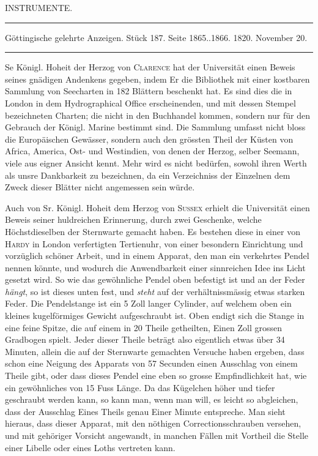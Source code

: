 \clearpage
{}
\begin{center}
{\large INSTRUMENTE.}
\end{center}

\begin{center}
\noindent\rule{\linewidth}{0.4pt}

Göttingische gelehrte Anzeigen. Stück 187. Seite 1865..1866. 1820. November 20.

\noindent\rule{\linewidth}{0.4pt}
\end{center}

Se Königl. Hoheit der Herzog von \textsc{Clarence} hat der Universität einen Beweis
seines gnädigen Andenkens gegeben, indem Er die Bibliothek mit einer kostbaren Sammlung
von Seecharten in 182 Blättern beschenkt hat. Es sind dies die in London in dem
Hydrographical Office erscheinenden, und mit dessen Stempel bezeichneten Charten; die
nicht in den Buchhandel kommen, sondern nur für den Gebrauch der Königl. Marine bestimmt
sind. Die Sammlung umfasst nicht bloss die Europäischen Gewässer, sondern auch den
grössten Theil der Küsten von Africa, America, Ost- und Westindien, von denen der
Herzog, selber Seemann, viele aus eigner Ansicht kennt. Mehr wird es nicht bedürfen,
sowohl ihren Werth als unsre Dankbarkeit zu bezeichnen, da ein Verzeichniss der
Einzelnen dem Zweck dieser Blätter nicht angemessen sein würde.

Auch von Sr. Königl. Hoheit dem Herzog von \textsc{Sussex} erhielt die Universität einen
Beweis seiner huldreichen Erinnerung, durch zwei Geschenke, welche Höchstdieselben der
Sternwarte gemacht haben. Es bestehen diese in einer von \textsc{Hardy} in London
verfertigten Tertienuhr, von einer besondern Einrichtung und vorzüglich schöner Arbeit,
und in einem Apparat, den man ein verkehrtes Pendel nennen könnte, und wodurch die
Anwendbarkeit einer sinnreichen Idee ins Licht gesetzt wird. So wie das gewöhnliche
Pendel oben befestigt ist und an der Feder \emph{hängt}, so ist dieses unten fest, und
\emph{steht} auf der verhältnissmässig etwas starken Feder. Die Pendelstange ist ein 5
Zoll langer Cylinder, auf welchem oben ein kleines kugelförmiges Gewicht aufgeschraubt
ist. Oben endigt sich die Stange in eine feine Spitze, die auf einem in 20 Theile
getheilten, Einen Zoll grossen Gradbogen spielt. Jeder dieser Theile beträgt also
eigentlich etwas über 34 Minuten, allein die auf der Sternwarte gemachten Versuche haben
ergeben, dass schon eine Neigung des Apparats von 57 Secunden einen Ausschlag von einem
Theile gibt, oder dass dieses Pendel eine eben so grosse Empfindlichkeit hat, wie ein
gewöhnliches von 15 Fuss Länge. Da das Kügelchen höher und tiefer geschraubt werden
kann, so kann man, wenn man will, es leicht so abgleichen, dass der Ausschlag Eines
Theils genau Einer Minute entspreche. Man sieht hieraus, dass dieser Apparat, mit den
nöthigen Correctionsschrauben versehen, und mit gehöriger Vorsicht angewandt, in manchen
Fällen mit Vortheil die Stelle einer Libelle oder eines Loths vertreten kann.

